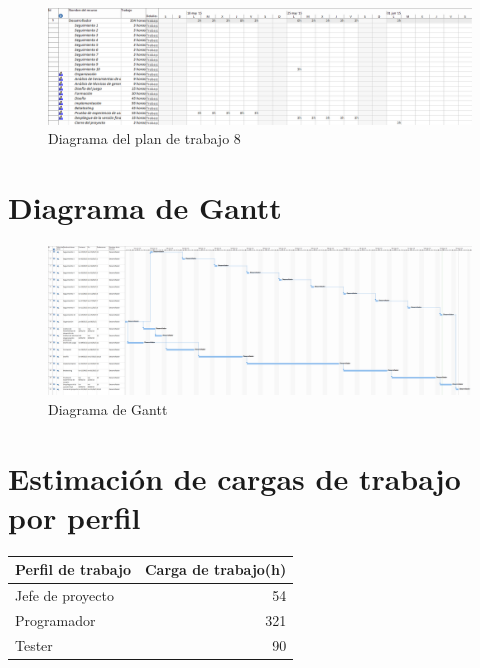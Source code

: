 \begin{figure}[!htp]
	\centering
	\includegraphics[page=8, scale=.5, angle=90]{fig/Plan8}
	\caption{Diagrama del plan de trabajo 8}
\end{figure}

\FloatBarrier

\section{Diagrama de Gantt}

\begin{figure}[!htp]
	\centering
	\includegraphics[page=1, scale=.25, angle=90]{fig/Gantt}
	\caption{Diagrama de Gantt}
\end{figure}

\FloatBarrier

\section{Estimación de cargas de trabajo por perfil}

\begin{center}
	\begin{tabular}{|l|r|}
		\hline
		Perfil de trabajo & Carga de trabajo(h) \\ \hline
		Jefe de proyecto & 54 \\ \hline
		Programador & 321 \\ \hline
		Tester & 90 \\ \hline
		\hline
	\end{tabular}
\end{center}

